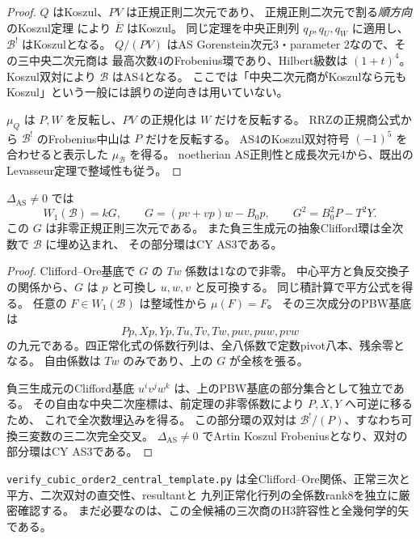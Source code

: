 \begin{proof}
$Q$ はKoszul、$PV$ は正規正則二次元であり、
正規正則二次元で割る\emph{順方向}のKoszul定理
\cite[Chapter 2, Corollary 6.3]{PolishchukPositselski}により $\overline E$ はKoszul。
同じ定理を中央正則列 $q_P,q_U,q_W$ に適用し、$\mathcal B^!$ はKoszulとなる。
$Q/(PV)$ はAS Gorenstein次元3・parameter 2なので、その三中央二次元商は
最高次数4のFrobenius環であり、Hilbert級数は $(1+t)^4$。
Koszul双対により $\mathcal B$ はAS4となる。
ここでは「中央二次元商がKoszulなら元もKoszul」という一般には誤りの逆向きは用いていない。

$\mu_Q$ は $P,W$ を反転し、$PV$ の正規化は $W$ だけを反転する。
RRZの正規商公式から $\mathcal B^!$ のFrobenius中山は $P$ だけを反転する。
AS4のKoszul双対符号 $(-1)^5$ を合わせると表示した $\mu_{\mathcal B}$ を得る。
noetherian AS正則性と成長次元4から、既出のLevasseur定理で整域性も従う。
\end{proof}

\begin{corollary}[全八係数の正常三次は一本]
\label{cor:h3-order2-eight-unique-cubic}
$\Delta_{\mathrm{AS}}\ne0$ では
\[
 W_1(\mathcal B)=kG,\qquad
 G=(pv+vp)w-B_0p,\qquad G^2=B_0^2P-T^2Y.
\]
この $G$ は非零正規正則三次元である。
また負三生成元の抽象Clifford環は全次数で $\mathcal B$ に埋め込まれ、
その部分環はCY AS3である。
\end{corollary}
\begin{proof}
Clifford--Ore基底で $G$ の $Tw$ 係数は1なので非零。
中心平方と負反交換子の関係から、$G$ は $p$ と可換し $u,w,v$ と反可換する。
同じ積計算で平方公式を得る。
任意の $F\in W_1(\mathcal B)$ は整域性から $\mu(F)=F$。
その三次成分のPBW基底は
\[
 Pp,Xp,Yp,Tu,Tv,Tw,puv,puw,pvw
\]
の九元である。四正常化式の係数行列は、全八係数で定数pivot八本、残余零となる。
自由係数は $Tw$ のみであり、上の $G$ が全核を張る。

負三生成元のClifford基底 $u^i v^j w^k$ は、上のPBW基底の部分集合として独立である。
その自由な中央二次座標は、前定理の非零係数により $P,X,Y$ へ可逆に移るため、
これで全次数埋込みを得る。
この部分環の双対は $\mathcal B^!/(P)$、すなわち可換三変数の三二次完全交叉。
$\Delta_{\mathrm{AS}}\ne0$ でArtin Koszul Frobeniusとなり、双対の部分環はCY AS3である。
\end{proof}
\texttt{verify\_\allowbreak{}cubic\_\allowbreak{}order2\_\allowbreak{}central\_\allowbreak{}template.py}
は全Clifford--Ore関係、正常三次と平方、二次双対の直交性、resultantと
九列正常化行列の全係数rank8を独立に厳密確認する。
まだ必要なのは、この全候補の三次商のH3許容性と全幾何学的矢である。

